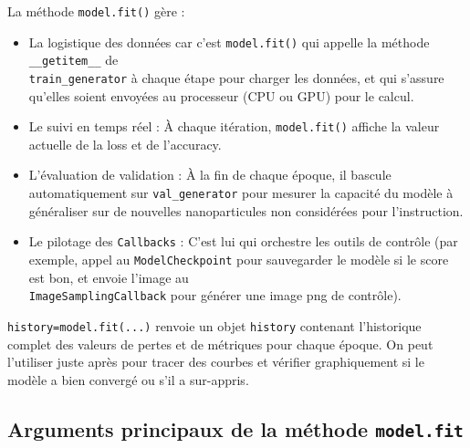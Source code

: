 \documentclass[12pt,a4paper,french]{book}
\begin{document}
La méthode \verb+model.fit()+ gère :
\begin{itemize}
	\item La logistique des données car c'est \verb+model.fit()+ qui appelle la méthode \verb+__getitem__+ de\\ \verb+train_generator+ à chaque étape pour charger les données, et qui s'assure qu'elles soient envoyées au processeur (CPU ou GPU) pour le calcul.
	\item Le suivi en temps réel : À chaque itération, \verb+model.fit()+ affiche la valeur actuelle de la loss et de l'accuracy.
	\item L'évaluation de validation : À la fin de chaque époque, il bascule automatiquement sur  \verb+val_generator+ pour mesurer la capacité du modèle à généraliser sur de nouvelles nanoparticules non considérées pour l'instruction.
	\item Le pilotage des \verb+Callbacks+ : C'est lui qui orchestre les outils de contrôle (par exemple, appel au \verb+ModelCheckpoint+ pour sauvegarder le modèle si le score est bon, et envoie l'image au \\ \verb+ImageSamplingCallback+ pour générer une image png de contrôle).
\end{itemize}

\verb+history=model.fit(...)+ renvoie un objet \verb+history+ contenant l'historique complet des valeurs de pertes et de métriques pour chaque époque. On peut l'utiliser juste après pour tracer des courbes et vérifier graphiquement si le modèle a bien convergé ou s'il a sur-appris.

\cprotect\subsection{Arguments principaux de la méthode \verb+model.fit+}
\end{document}
